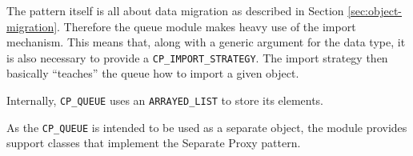 The pattern itself is all about data migration as described in Section \ref{sec:object-migration}.
Therefore the queue module makes heavy use of the import mechanism.
This means that, along with a generic argument for the data type, it is also necessary to provide a \lstinline!CP_IMPORT_STRATEGY!.
The import strategy then basically ``teaches'' the queue how to import a given object.

Internally, \lstinline!CP_QUEUE! uses an \lstinline!ARRAYED_LIST! to store its elements.

As the \lstinline!CP_QUEUE! is intended to be used as a separate object, the module provides support classes that implement the Separate Proxy pattern.

% 
% 
% 

